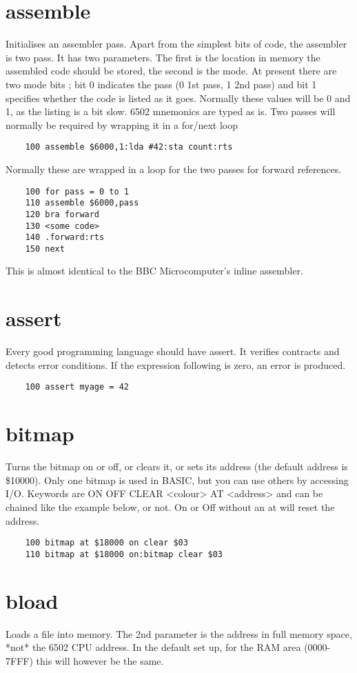 \section*{assemble}
Initialises an assembler pass. Apart from the simplest bits of code, the assembler is two pass. It has two parameters. The first is the location in memory the assembled code should be stored, the second is the mode. At present there are two mode bits ; bit 0 indicates the pass (0 1st pass, 1 2nd pass) and bit 1 specifies whether the code is listed as it goes. Normally these values will be 0 and 1, as the listing is a bit slow. 6502 mnemonics are typed as is. Two passes will normally be required by wrapping it in a for/next loop
\example{}
\begin{verbatim}
	100 assemble $6000,1:lda #42:sta count:rts
\end{verbatim}
Normally these are wrapped in a loop for the two passes for forward references.
\example{}
\begin{verbatim}
	100 for pass = 0 to 1
	110 assemble $6000,pass
	120 bra forward
	130 <some code>
	140 .forward:rts
	150 next
\end{verbatim}
This is almost identical to the BBC Microcomputer’s inline assembler.

\section*{assert}
Every good programming language should have assert. It verifies contracts and detects error conditions. If the expression following is zero, an error is produced.
\example{}
\begin{verbatim}
	100 assert myage = 42
\end{verbatim}

\section*{bitmap}
Turns the bitmap on or off, or clears it, or sets its address (the default address is \$10000). Only one bitmap is used in BASIC, but you can use others by accessing I/O. Keywords are ON OFF CLEAR <colour> AT <address> and can be chained like the example below, or not. On or Off without an at will reset the address.
\example{}
\begin{verbatim}
	100 bitmap at $18000 on clear $03
	110 bitmap at $18000 on:bitmap clear $03
\end{verbatim}

\section*{bload}
Loads a file into memory. The 2nd parameter is the address in full memory space, *not* the 6502 CPU address. In the default set up, for the RAM area (0000-7FFF) this will however be the same.

